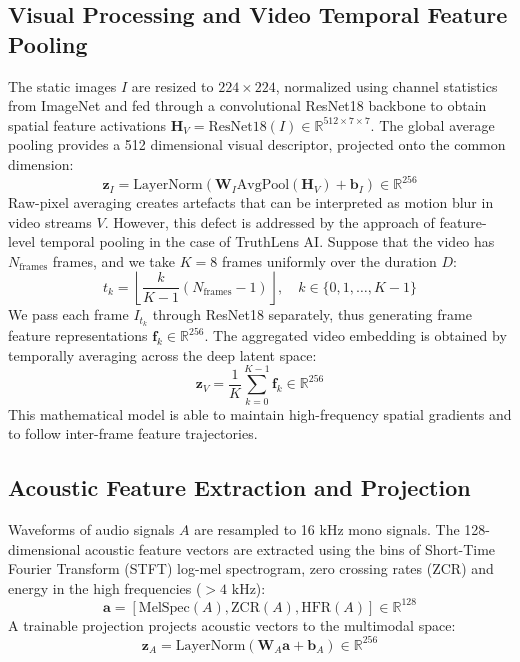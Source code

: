 \documentclass[conference]{IEEEtran}
\begin{document}
\subsection{Visual Processing and Video Temporal Feature Pooling}
The static images $I$ are resized to $224 \times 224$, normalized using channel statistics from ImageNet and fed through a convolutional ResNet18 backbone \cite{he2016deep} to obtain spatial feature activations $\mathbf{H}_V = \text{ResNet18}(I) \in \mathbb{R}^{512 \times 7 \times 7}$. The global average pooling provides a 512 dimensional visual descriptor, projected onto the common dimension:
\begin{equation}
\mathbf{z}_I = \text{LayerNorm}(\mathbf{W}_I \text{AvgPool}(\mathbf{H}_V) + \mathbf{b}_I) \in \mathbb{R}^{256}
\end{equation}
Raw-pixel averaging creates artefacts that can be interpreted as motion blur in video streams $V$. However, this defect is addressed by the approach of feature-level temporal pooling in the case of TruthLens AI. Suppose that the video has $N_{\text{frames}}$ frames, and we take $K = 8$ frames uniformly over the duration $D$:
\begin{equation}
t_k = \left\lfloor \frac{k}{K-1} (N_{\text{frames}} - 1) \right\rfloor, \quad k \in \{0, 1, \dots, K-1\}
\end{equation}
We pass each frame $I_{t_k}$ through ResNet18 separately, thus generating frame feature representations $\mathbf{f}_k \in \mathbb{R}^{256}$. The aggregated video embedding is obtained by temporally averaging across the deep latent space:
\begin{equation}
\mathbf{z}_V = \frac{1}{K} \sum_{k=0}^{K-1} \mathbf{f}_k \in \mathbb{R}^{256}
\end{equation}
This mathematical model is able to maintain high-frequency spatial gradients and to follow inter-frame feature trajectories.

\subsection{Acoustic Feature Extraction and Projection}
Waveforms of audio signals $A$ are resampled to 16 kHz mono signals. The 128-dimensional acoustic feature vectors are extracted using the bins of Short-Time Fourier Transform (STFT) log-mel spectrogram, zero crossing rates (ZCR) and energy in the high frequencies ($> 4\text{ kHz}$):
\begin{equation}
\mathbf{a} = [\text{MelSpec}(A), \text{ZCR}(A), \text{HFR}(A)] \in \mathbb{R}^{128}
\end{equation}
A trainable projection projects acoustic vectors to the multimodal space:
\begin{equation}
\mathbf{z}_A = \text{LayerNorm}(\mathbf{W}_A \mathbf{a} + \mathbf{b}_A) \in \mathbb{R}^{256}
\end{equation}
\end{document}

